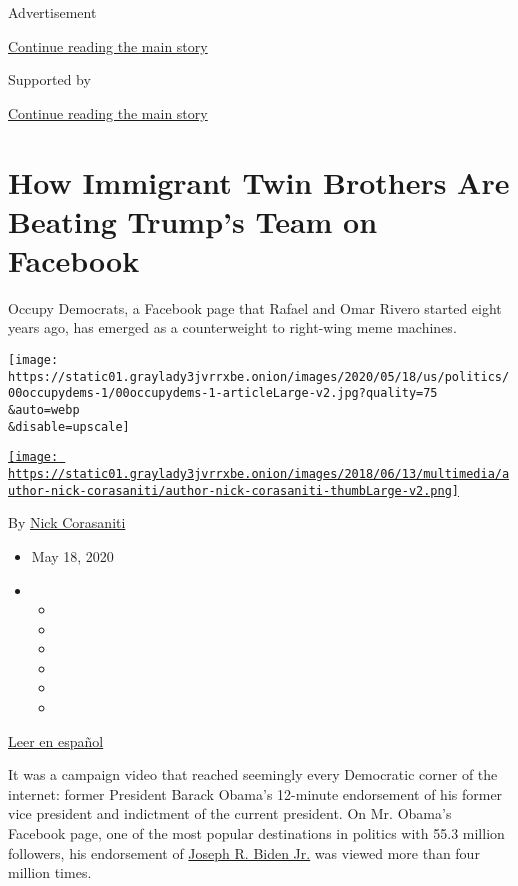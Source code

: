 Advertisement

\protect\hyperlink{after-top}{Continue reading the main story}

Supported by

\protect\hyperlink{after-sponsor}{Continue reading the main story}

\hypertarget{how-immigrant-twin-brothers-are-beating-trumps-team-on-facebook}{%
\section{How Immigrant Twin Brothers Are Beating Trump's Team on
Facebook}\label{how-immigrant-twin-brothers-are-beating-trumps-team-on-facebook}}

Occupy Democrats, a Facebook page that Rafael and Omar Rivero started
eight years ago, has emerged as a counterweight to right-wing meme
machines.

\texttt{[image: https://static01.graylady3jvrrxbe.onion/images/2020/05/18/us/politics/00occupydems-1/00occupydems-1-articleLarge-v2.jpg?quality=75\\\&auto=webp\\\&disable=upscale]}

\href{https://www.nytimes3xbfgragh.onion/by/nick-corasaniti}{\texttt{[image: https://static01.graylady3jvrrxbe.onion/images/2018/06/13/multimedia/author-nick-corasaniti/author-nick-corasaniti-thumbLarge-v2.png]}}

By \href{https://www.nytimes3xbfgragh.onion/by/nick-corasaniti}{Nick
Corasaniti}

\begin{itemize}
\item
  May 18, 2020
\item
  \begin{itemize}
  \item
  \item
  \item
  \item
  \item
  \item
  \end{itemize}
\end{itemize}

\href{https://www.nytimes3xbfgragh.onion/es/2020/05/21/espanol/occupy-democrats-facebook-trump.html}{Leer
en español}

It was a campaign video that reached seemingly every Democratic corner
of the internet: former President Barack Obama's 12-minute endorsement
of his former vice president and indictment of the current president. On
Mr. Obama's Facebook page, one of the most popular destinations in
politics with 55.3 million followers, his endorsement of
\href{https://www.nytimes3xbfgragh.onion/interactive/2020/us/elections/joe-biden.html}{Joseph
R. Biden Jr.} was viewed more than four million times.

